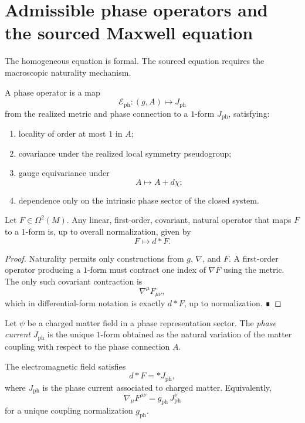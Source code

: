 \section{Admissible phase operators and the sourced Maxwell equation}
\label{sec:em-sourced-maxwell}
The homogeneous equation is formal.
The sourced equation requires the macroscopic naturality mechanism.
\begin{definition}
	A phase operator is a map
	\[
		\mathcal E_{\mathrm{ph}}:(g,A)\mapsto J_{\mathrm{ph}}
	\]
	from the realized metric and phase connection to a \(1\)-form
	\(J_{\mathrm{ph}}\),
	satisfying:
	\begin{enumerate}
		\item locality of order at most \(1\) in \(A\);
		\item covariance under the realized local symmetry pseudogroup;
		\item gauge equivariance under
		      \[
			      A\mapsto A+d\chi;
		      \]
		\item dependence only on the intrinsic phase sector of the closed
		      system.
	\end{enumerate}
\end{definition}
\begin{lemma}
	\label{lem:em-natural-operator}
	Let \(F\in\Omega^2(M)\).
	Any linear, first-order, covariant, natural operator that maps \(F\) to
	a \(1\)-form is, up to overall normalization, given by
	\[
		F\mapsto d{*}F.
	\]
\end{lemma}
\begin{proof}
	Naturality permits only constructions from \(g\), \(\nabla\), and \(F\).
	A first-order operator producing a \(1\)-form must contract one index
	of \(\nabla F\) using the metric.
	The only such covariant contraction is
	\[
		\nabla^\mu F_{\mu\nu},
	\]
	which in differential-form notation is exactly \(d{*}F\), up to
	normalization. ∎
\end{proof}
\begin{definition}
	Let \(\psi\) be a charged matter field in a phase representation sector.
	The \emph{phase current} \(J_{\mathrm{ph}}\) is the unique \(1\)-form
	obtained as the natural variation of the matter coupling with respect to
	the phase connection \(A\).
\end{definition}
\begin{theorem}
	\label{thm:em-sourced-maxwell}
	The electromagnetic field satisfies
	\[
		d{*}F = {*}J_{\mathrm{ph}},
	\]
	where \(J_{\mathrm{ph}}\) is the phase current associated to charged
	matter.
	Equivalently,
	\[
		\nabla_\mu F^{\mu\nu}=g_{\mathrm{ph}}\,J_{\mathrm{ph}}^\nu
	\]
	for a unique coupling normalization \(g_{\mathrm{ph}}\).
\end{theorem}

